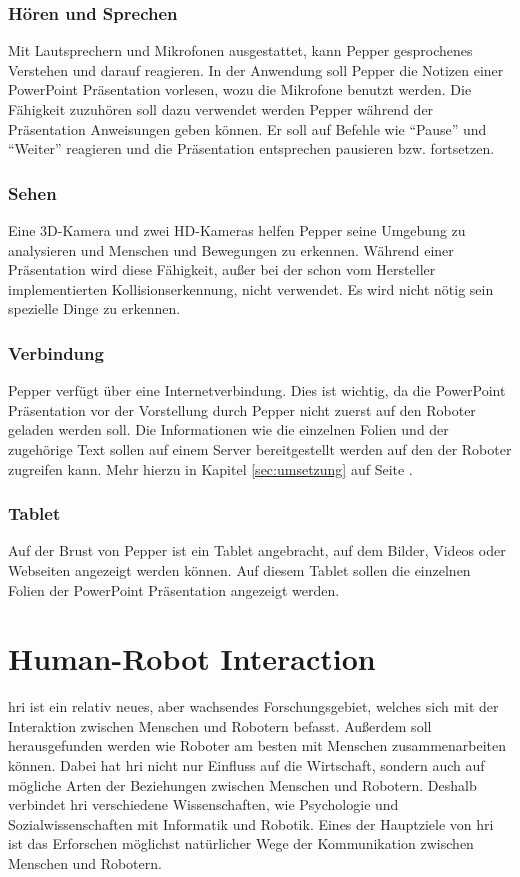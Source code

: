 \subsubsection{Hören und Sprechen}\label{sec:hoeren-und-sehen}
Mit Lautsprechern und Mikrofonen ausgestattet, kann Pepper gesprochenes
Verstehen und darauf reagieren. In der Anwendung soll Pepper die Notizen einer
PowerPoint Präsentation vorlesen, wozu die Mikrofone benutzt werden. Die
Fähigkeit zuzuhören soll dazu verwendet werden Pepper während der Präsentation
Anweisungen geben können. Er soll auf Befehle wie "`Pause"' und "`Weiter"'
reagieren und die Präsentation entsprechen pausieren bzw. fortsetzen.

\subsubsection{Sehen}\label{sec:sehen}
Eine 3D-Kamera und zwei HD-Kameras helfen Pepper seine Umgebung zu analysieren
und Menschen und Bewegungen zu erkennen. Während einer Präsentation wird diese
Fähigkeit, außer bei der schon vom Hersteller implementierten
Kollisionserkennung, nicht verwendet. Es wird nicht nötig sein spezielle Dinge
zu erkennen.

\subsubsection{Verbindung}\label{sec:verbindung}
Pepper verfügt über eine Internetverbindung. Dies ist wichtig, da die PowerPoint
Präsentation vor der Vorstellung durch Pepper nicht zuerst auf den Roboter
geladen werden soll. Die Informationen wie die einzelnen Folien und der
zugehörige Text sollen auf einem Server bereitgestellt werden auf den der
Roboter zugreifen kann. Mehr hierzu in Kapitel \ref{sec:umsetzung} auf Seite
\pageref{sec:umsetzung}.

\subsubsection{Tablet}\label{sec:tablet}
Auf der Brust von Pepper ist ein Tablet angebracht, auf dem Bilder, Videos oder
Webseiten angezeigt werden können. Auf diesem Tablet sollen die einzelnen Folien
der PowerPoint Präsentation angezeigt werden. \cite{SoftBankII2018}

\section{Human-Robot Interaction}\label{sec:hri}
\ac{hri} ist ein relativ neues, aber wachsendes Forschungsgebiet, welches sich
mit der Interaktion zwischen Menschen und Robotern befasst. Außerdem soll
herausgefunden werden wie Roboter am besten mit Menschen zusammenarbeiten
können. Dabei hat \ac{hri} nicht nur Einfluss auf die Wirtschaft, sondern auch
auf mögliche Arten der Beziehungen zwischen Menschen und Robotern. Deshalb
verbindet \ac{hri} verschiedene Wissenschaften, wie Psychologie und
Sozialwissenschaften mit Informatik und Robotik. Eines der Hauptziele von
\ac{hri} ist das Erforschen möglichst natürlicher Wege der Kommunikation
zwischen Menschen und Robotern. \cite{Dautenhahn2011}

